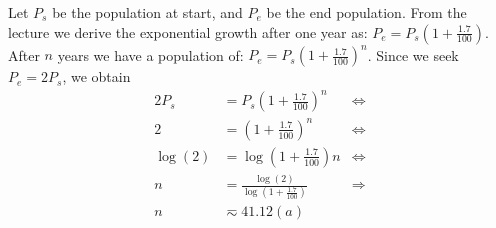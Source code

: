 \documentclass[10pt,a4paper,boxed]{hmcpset}
\begin{document}
\begin{problem}[Assignment 31]
\end{problem}
\begin{solution}
Let $P_s$ be the population at start, and $P_e$ be the end population.
From the lecture we derive the exponential growth after one year as: $P_e = P_s \left( 1 + \frac{1.7}{100} \right)$.
After $n$ years we have a population of: $P_e = P_s \left( 1 + \frac{1.7}{100} \right)^n$. Since we seek $P_e = 2 P_s$, we obtain
\begin{align*}
	2 P_s & = P_s \left( 1 + \frac{1.7}{100} \right)^n & \Leftrightarrow \\
	2 & = \left( 1 + \frac{1.7}{100} \right)^n & \Leftrightarrow \\
	\log(2) & = \log \left( 1 + \frac{1.7}{100} \right) n & \Leftrightarrow \\
	n & = \frac{\log(2)}{\log \left( 1 + \frac{1.7}{100} \right)} & \Rightarrow \\
	n & \eqsim 41.12 (a)
\end{align*}
\end{solution}

\begin{problem}[Assignment 32]
\end{problem}
\begin{solution}
\end{solution}

\begin{problem}[Assignment 33]
\end{problem}
\begin{solution}
\end{solution}

\begin{problem}[Assignment 34]
\end{problem}
\begin{solution}
\end{solution}

\begin{problem}[Assignment 35]
\end{problem}
\begin{solution}
\end{solution}

\begin{problem}[Assignment 36]
\end{problem}
\begin{solution}
\end{solution}
\end{document}
